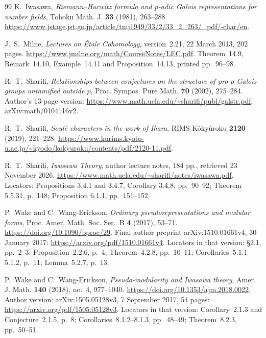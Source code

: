 \documentclass[11pt]{article}
\theoremstyle{definition}
\numberwithin{equation}{section}
\begin{document}
\begin{thebibliography}{99}
K.~Iwasawa, \emph{Riemann--Hurwitz formula and $p$-adic Galois
representations for number fields},
Tohoku Math. J. \textbf{33} (1981), 263--288.
\url{https://www.jstage.jst.go.jp/article/tmj1949/33/2/33_2_263/_pdf/-char/en}.

J.~S.~Milne,
\emph{Lectures on \textup{\'Etale} Cohomology},
version~2.21, 22 March 2013, 202 pages.
\url{https://www.jmilne.org/math/CourseNotes/LEC.pdf}.
Theorem~14.9, Remark~14.10, Example~14.11 and Proposition~14.13,
printed pp.~96--98.

R.~T.~Sharifi, \emph{Relationships between conjectures on the structure
of pro-$p$ Galois groups unramified outside $p$},
Proc. Sympos. Pure Math. \textbf{70} (2002), 275--284.
Author's 13-page version: \url{https://www.math.ucla.edu/~sharifi/publ/galstr.pdf};
arXiv:math/0104116v2.

R.~T.~Sharifi, \emph{Soul\'e characters in the work of Ihara}, RIMS K\^oky\^uroku
\textbf{2120} (2019), 221--228.
\url{https://www.kurims.kyoto-u.ac.jp/~kyodo/kokyuroku/contents/pdf/2120-11.pdf}.

R.~T.~Sharifi, \emph{Iwasawa Theory}, author lecture notes, 184 pp.,
retrieved 23 November 2026.
\url{https://www.math.ucla.edu/~sharifi/notes/iwasawa.pdf}.
Locators: Propositions 3.4.1 and 3.4.7, Corollary 3.4.8, pp.~90--92;
Theorem 5.5.31, p.~148; Proposition 6.1.1, pp.~151--152.

P.~Wake and C.~Wang-Erickson,
\emph{Ordinary pseudorepresentations and modular forms},
Proc. Amer. Math. Soc. Ser.~B \textbf{4} (2017), 53--71.
\url{https://doi.org/10.1090/bproc/29}.
Final author preprint arXiv:1510.01661v4, 30 January 2017:
\url{https://arxiv.org/pdf/1510.01661v4}.
Locators in that version: \S2.1, pp.~2--3;
Proposition~2.2.6, p.~4; Theorem~4.2.8, pp.~10--11;
Corollaries~5.1.1--5.1.2, p.~11; Lemma~5.2.7, p.~13.

P.~Wake and C.~Wang-Erickson,
\emph{Pseudo-modularity and Iwasawa theory},
Amer. J. Math. \textbf{140} (2018), no.~4, 977--1040.
\url{https://doi.org/10.1353/ajm.2018.0022}.
Author version: arXiv:1505.05128v3,
7 September 2017, 54 pages:
\url{https://arxiv.org/pdf/1505.05128v3}.
Locators in that version: Corollary~2.1.3 and Conjecture~2.1.5, p.~8;
Corollaries~8.1.2--8.1.3, pp.~48--49;
Theorem~8.2.3, pp.~50--51.
\end{thebibliography}
\endgroup
\end{document}
